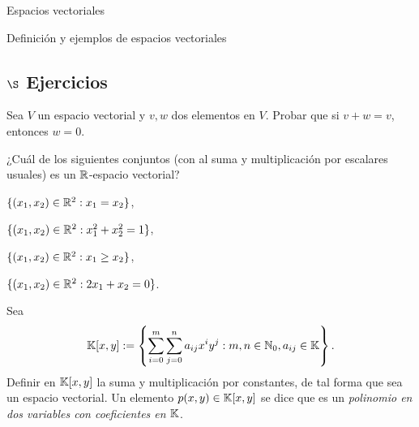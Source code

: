 \begin{chapter}{Espacios vectoriales}
\begin{section}{Definici\'on y ejemplos de espacios vectoriales}
            \subsection*{$\S$ Ejercicios}
            \begin{enumex}
                \item Sea $V$  un espacio vectorial y $v,w$  dos elementos en $V$. Probar que si $v+w =v$,  entonces $w=0$.
                \item ¿Cuál de los siguientes conjuntos (con al suma y multiplicación por escalares usuales)  es un $\mathbb R$-espacio vectorial?
                    \begin{enumex}
                        \begin{minipage}{0.4\textwidth}
                            \item $\{(x_1,x_2)\in\mathbb R^2: x_1=x_2 \}$,
                        \end{minipage}
                        \begin{minipage}{0.4\textwidth}
                            \item $\{(x_1,x_2)\in\mathbb R^2: x_1^2 + x_2^2 = 1 \}$,
                        \end{minipage}

                        \begin{minipage}{0.4\textwidth}
                            \item $\{(x_1,x_2)\in\mathbb R^2: x_1 \ge x_2\}$,
                        \end{minipage}
                        \begin{minipage}{0.4\textwidth}
                            \item $\{(x_1,x_2)\in\mathbb R^2: 2x_1 +x_2 =0\}$.
                        \end{minipage}
                    \end{enumex}
                \item\label{ejercicio-polinomios-en-2-variables} Sea
                $$
                \mathbb K[x,y] := \left\{\sum_{i=0}^m\sum_{j=0}^n a_{ij}x^iy^j: m,n \in \mathbb N_0, a_{ij} \in \mathbb K\right\}.
                $$ 
                Definir en $\mathbb K[x,y]$ la suma y multiplicación por constantes, de tal forma que sea un espacio vectorial. Un  elemento $p(x,y) \in \mathbb K[x,y]$ se dice que es un  \textit{polinomio en dos variables con coeficientes en $\mathbb K$}.


\end{enumex}
\end{section}
\end{chapter}

